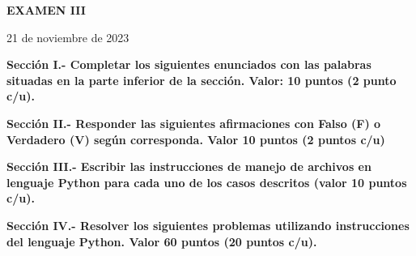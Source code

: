 \documentclass[10pt,addpoints]{exam}
\begin{document}
\begin{center}
  \sffamily\textbf{EXAMEN III}
\end{center}
\begin{flushright}
21 de noviembre de 2023
\end{flushright}

\begin{questions}
\begin{EnvFullwidth}
  \sffamily\textbf{Sección I.- Completar los siguientes enunciados con las
  palabras situadas en la parte inferior de la sección. Valor: 10 puntos
  (2 punto c/u).}
\end{EnvFullwidth}








\end{questions}

\begin{questions}
\begin{EnvFullwidth}
  \sffamily\textbf{Sección II.- Responder las siguientes afirmaciones con
  Falso (F) o Verdadero (V) según corres\-ponda. Valor 10 puntos (2 puntos c/u)}
\end{EnvFullwidth}







\end{questions}


\begin{questions}
\begin{EnvFullwidth}
  \sffamily\textbf{Sección III.- Escribir las instrucciones de manejo de
  archivos en lenguaje Python para cada uno de los casos descritos (valor 10
  puntos c/u).
  }
\end{EnvFullwidth}



%

\end{questions}

\begin{questions}
\begin{EnvFullwidth}
  \sffamily\textbf{Sección IV.- Resolver los siguientes problemas utilizando
  instrucciones del lenguaje Python. Valor 60 puntos (20 puntos c/u).}
\end{EnvFullwidth}





\end{questions}
\end{document}
